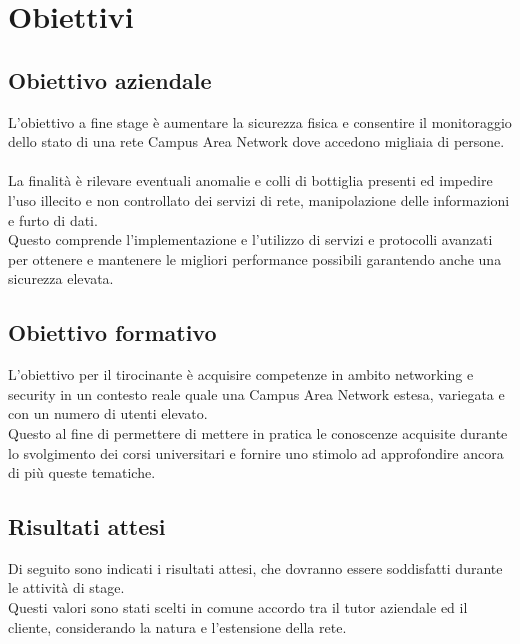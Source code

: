 \documentclass[Tesi.tex]{subfiles}
\begin{document}
\newpage
\chapter{Obiettivi}
\section{Obiettivo aziendale}
L'obiettivo a fine stage è aumentare la sicurezza fisica e consentire il monitoraggio dello stato di una rete Campus Area Network dove accedono migliaia di persone. \\\\
La finalità è rilevare eventuali anomalie e colli di bottiglia presenti ed impedire l'uso illecito e non controllato dei servizi di rete, manipolazione delle informazioni e furto di dati. \\
Questo comprende l'implementazione e l'utilizzo di servizi e protocolli avanzati per ottenere e mantenere le migliori performance possibili garantendo anche una sicurezza elevata.

\section{Obiettivo formativo}
L'obiettivo per il tirocinante è acquisire competenze in ambito networking e security in un contesto reale quale una Campus Area Network estesa, variegata e con un numero di utenti elevato. \\
Questo al fine di permettere di mettere in pratica le conoscenze acquisite durante lo svolgimento dei corsi universitari e fornire uno stimolo ad approfondire ancora di più queste tematiche.

\newpage
\section{Risultati attesi}
Di seguito sono indicati i risultati attesi, che dovranno essere soddisfatti durante le attività di stage. \\
Questi valori sono stati scelti in comune accordo tra il tutor aziendale ed il cliente, considerando la natura e l'estensione della rete.
\end{document}
